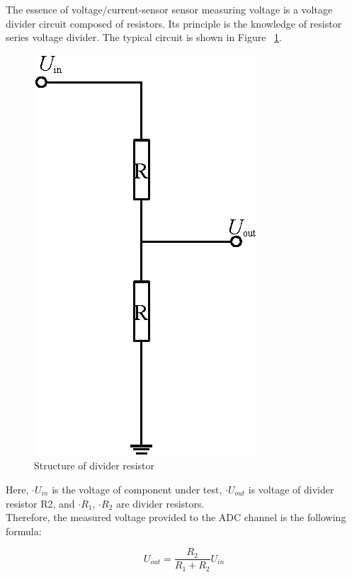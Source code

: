 The essence of voltage/current-sensor sensor measuring voltage is a voltage divider circuit composed of resistors. Its principle is the knowledge of resistor series voltage divider. The typical circuit is shown in Figure ~\ref{fig:2.1}. 
\begin{figure}[h]
	\centering
	\includegraphics{grafiken/2.1.eps}
	\caption{Structure of divider resistor} 
	\label{fig:2.1}
\end{figure}
Here, $\cdot U_{in}$ is the voltage of component under test, $\cdot U_{out}$ is voltage of divider resistor R2, and $\cdot R_{1}$, $\cdot R_{2}$ are divider resistors.
\\
Therefore, the measured voltage provided to the ADC channel is the following formula:
\\
\begin{center} 
\begin{equation}
 U_{out} = \frac{R_{2}}{R_{1}+R_{2}} U_{in}  
\end{equation}
\end{center}

